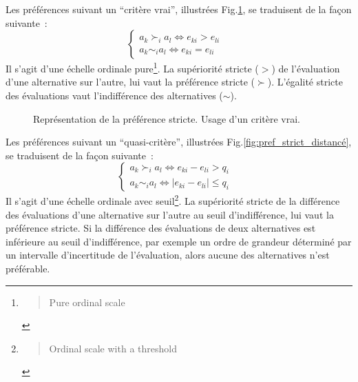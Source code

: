 Les préférences suivant un ``critère vrai'', illustrées Fig.\ref{fig:pref_strict}, se traduisent de la façon suivante~:
\begin{equation}
\begin{cases} a_{k} \succ_{i} a_{l} \Leftrightarrow e_{ki} > e_{li} & \\
a_{k} \sim_{i} a_{l} \Leftrightarrow e_{ki} = e_{li} &
\end{cases}
\end{equation} 
Il s'agit d'une échelle ordinale pure\footnote{\blockcquote[section 3.7.1.1]{bouyssou_evaluation_2006}{Pure ordinal scale}}.
La supériorité stricte ($ > $) de l'évaluation d'une alternative sur l'autre, lui vaut la préférence stricte ($ \succ $).
L'égalité stricte des évaluations vaut l'indifférence des alternatives ($ \sim $).
\begin{figure}
\centering
{}
\caption{Représentation de la préférence stricte. Usage d'un critère vrai.}
\label{fig:pref_strict}
\end{figure}

Les préférences suivant un ``quasi-critère'', illustrées Fig.\ref{fig:pref_strict_distancé}, se traduisent de la façon suivante~:
\begin{equation}
\begin{cases} a_{k} \succ_{i} a_{l} \Leftrightarrow e_{ki} - e_{li} > q_i & \\
a_{k} \sim_{i} a_{l} \Leftrightarrow |e_{ki} - e_{li}| \leq q_i & 
\end{cases}
\end{equation} 
Il s'agit d'une échelle ordinale avec seuil\footnote{\blockcquote[section 3.7.1.2]{bouyssou_evaluation_2006}{Ordinal scale with a threshold}}.
La supériorité stricte de la différence des évaluations d'une alternative sur l'autre au seuil d'indifférence, lui vaut la préférence stricte. Si la différence des évaluations de deux alternatives est inférieure au seuil d'indifférence, par exemple un ordre de grandeur déterminé par un intervalle d'incertitude de l'évaluation, alors aucune des alternatives n'est préférable.

